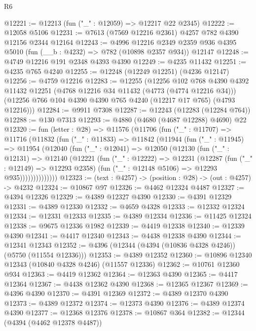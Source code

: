\begin{lexlean}{R6}
\begin{coremodule}
@12221 := @12213 (fun ("_" : @12059) => @12217 @22 @2345)
@12222 := @12058 @5106
@12231 := @7613 (@7569 @12216 @2361) @4257 @782 @4390 @12156 @2344 @12164
@12243 := @4996
    @12216
    @2349
    @2359
    @936
    @4395
    @5010
    (fun (__b : @4232) => @782 (@10898 @2357 @934))
    @12147
@12248 := @4749 @12216 @191 @2348 @4393 @4390
@12249 := @4235 @11432
@12251 := @4235 @765 @4240
@12255 := @12248 (@12249 @12251) (@4236 @12147)
@12256 := @4759 @12216
@12283 := @12255
    (@12256
      @102
      @768
      @4390
      @4392
      @11432
      @12251
      (@4768 @12216 @34 @11432 (@4773 (@4774 @12216 @34)))
      (@12256 @766 @104 @4390 @4390 @765 @4240 (@12217 @17 @765) (@4793 @12216)))
@12284 := @9911 @7308
@12287 := @12243 (@12283 (@12284 @764))
@12288 := @130 @7313
@12293 := @4880 (@4680 (@4687 @12288) @4690) @22
@12320 := fun (letter : @28) =>
  @11576
    (@11706
      (fun ("_" : @11707) =>
      @11716
        (@11832
          (fun ("_" : @11833) =>
          @11842
            (@11944
              (fun ("_" : @11945) =>
              @11954
                (@12040
                  (fun ("_" : @12041) =>
                  @12050
                    (@12130
                      (fun ("_" : @12131) =>
                      @12140
                        (@12221
                          (fun ("_" : @12222) =>
                          @12231
                            (@12287
                              (fun ("_" : @12149) => @12293 @2358)
                              (fun ("_" : @12148 @5106) => @12293 @935))))))))))))))
@12323 := (text : @4257) -> (position : @28) -> (out : @4257) -> @4232
@12324 := @10867 @97
@12326 := @4462 @12324 @4487
@12327 := @4394 @12326
@12329 := @4389 @12327 @4390
@12330 := @4391 @12329
@12331 := @4389 @12330
@12332 := @4659 @4328
@12333 := @12332 @12324
@12334 := @12331 @12333
@12335 := @4389 @12334
@12336 := @11425 @12324
@12338 := @9675 @12336 @1982
@12339 := @4419 @12338
@12340 := @12339 @4390
@12341 := @4417 @12340
@12343 := @4438 @12338 @4390
@12344 := @12341 @12343
@12352 := @4396 (@12344 (@4394 (@10836 @4328 @4246)) (@5750 (@11554 @12336)))
@12353 := @4389 @12352
@12360 := @10896 @12340 @12343 (@10840 @4328 @4246) (@11557 @12336)
@12362 := @10761 @12360 @934
@12363 := @4419 @12362
@12364 := @12363 @4390
@12365 := @4417 @12364
@12367 := @4438 @12362 @4390
@12368 := @12365 @12367
@12369 := @4396 @4390
@12370 := @4391 @12369
@12372 := @4389 @12370 @4390
@12373 := @4389 @12372
@12374 := @12373 @4390
@12376 := @4389 @12374 @4390
@12377 := @12368 @12376
@12378 := @10867 @364
@12382 := @12344 (@4394 (@4462 @12378 @4487))

\end{coremodule}
\end{lexlean}
